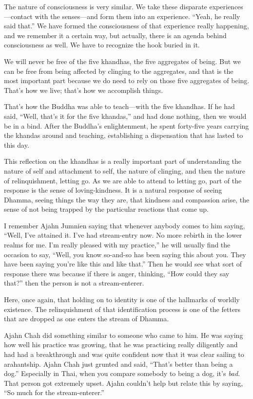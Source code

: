 The nature of consciousness is very similar. We take these disparate
experiences—contact with the senses—and form them into an experience.
“Yeah, he really said that.” We have formed the consciousness of that
experience really happening, and we remember it a certain way, but
actually, there is an agenda behind consciousness as well. We have to
recognize the hook buried in it.

We will never be free of the five khandhas, the five aggregates of
being. But we can be free from being affected by clinging to the
aggregates, and that is the most important part because we do need to
rely on those five aggregates of being. That’s how we live; that’s how
we accomplish things.

That’s how the Buddha was able to teach—with the five khandhas. If he
had said, “Well, that’s it for the five khandas,” and had done nothing,
then we would be in a bind. After the Buddha’s enlightenment, he spent
forty-five years carrying the khandas around and teaching, establishing
a dispensation that has lasted to this day.

This reflection on the khandhas is a really important part of
understanding the nature of self and attachment to self, the nature of
clinging, and then the nature of relinquishment, letting go. As we are
able to attend to letting go, part of the response is the sense of
loving-kindness. It is a natural response of seeing Dhamma, seeing
things the way they are, that kindness and compassion arise, the sense
of not being trapped by the particular reactions that come up.

I remember Ajahn Jumnien saying that whenever anybody comes to him
saying, “Well, I’ve attained it. I’ve had stream-entry now. No more
rebirth in the lower realms for me. I’m really pleased with my
practice,” he will usually find the occasion to say, “Well, you know
so-and-so has been saying this about you. They have been saying you’re
like this and like that.” Then he would see what sort of response there
was because if there is anger, thinking, “How could they say that?” then
the person is not a stream-enterer.

Here, once again, that holding on to identity is one of the hallmarks of
worldly existence. The relinquishment of that identification process is
one of the fetters that are dropped as one enters the stream of Dhamma.

Ajahn Chah did something similar to someone who came to him. He was
saying how well his practice was growing, that he was practicing really
diligently and had had a breakthrough and was quite confident now that
it was clear sailing to arahantship. Ajahn Chah just grunted and said,
“That’s better than being a dog.” Especially in Thai, when you compare
somebody to being a dog, it’s \emph{bad}. That person got extremely
upset. Ajahn couldn’t help but relate this by saying, “So much for the
stream-enterer.”

